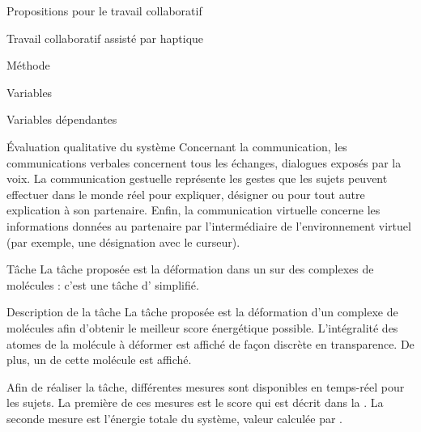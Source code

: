 \documentclass[myfrancais]{mythesis}
\begin{document}
\begin{mypart}{Propositions pour le travail collaboratif}
\begin{mychapter}{Travail collaboratif assisté par haptique}
\begin{mysection}{Méthode}
\begin{mysubsection}{Variables}
\begin{mysubsubsection}{Variables dépendantes}
\begin{myparagraph}{ Évaluation qualitative du système}
							Concernant la communication, les communications verbales concernent tous les échanges, dialogues exposés par la voix.
							La communication gestuelle représente les gestes que les sujets peuvent effectuer dans le monde réel pour expliquer, désigner ou pour tout autre explication à son partenaire.
							Enfin, la communication virtuelle concerne les informations données au partenaire par l'intermédiaire de l'environnement virtuel (par exemple, une désignation avec le curseur).
						\end{myparagraph}
					\end{mysubsubsection}
				\end{mysubsection}
				\begin{mysubsection}[sse-exp4-Tache]{Tâche}
					La tâche proposée est la déformation dans un  sur des complexes de molécules : c'est une tâche d' simplifié.

					\begin{mysubsubsection}{Description de la tâche}
						La tâche proposée est la déformation d'un complexe de molécules afin d'obtenir le meilleur score énergétique possible.
						L'intégralité des atomes de la molécule à déformer est affiché de façon discrète en transparence.
						De plus, un  de cette molécule est affiché.

						Afin de réaliser la tâche, différentes mesures sont disponibles en temps-réel pour les sujets.
						La première de ces mesures est le score  qui est décrit dans la .
						La seconde mesure est l'énergie totale du système, valeur calculée par .


\end{mysubsubsection}
\end{mysubsection}
\end{mysection}
\end{mychapter}
\end{mypart}
\end{document}
